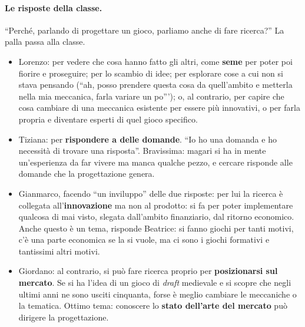 \paragraph{Le risposte della classe.} ``Perché, parlando di progettare un gioco,
parliamo anche di fare ricerca?'' La palla passa alla classe.
\begin{itemize}
  \item Lorenzo: per vedere che cosa hanno fatto gli altri, come \textbf{seme} per
        poter poi fiorire e proseguire; per lo scambio di idee; per esplorare cose a
        cui non si stava pensando (``ah, posso prendere questa cosa da quell'ambito e
        metterla nella mia meccanica, farla variare un po'''); o, al contrario, per
        capire che cosa cambiare di una meccanica esistente per essere più innovativi,
        o per farla propria e diventare esperti di quel gioco specifico.
  \item Tiziana: per \textbf{rispondere a delle domande}. ``Io ho una domanda e ho
        necessità di trovare una risposta''. Bravissima: magari si ha in mente
        un'esperienza da far vivere ma manca qualche pezzo, e cercare risponde alle
        domande che la progettazione genera.
  \item Gianmarco, facendo ``un inviluppo'' delle due risposte: per lui la ricerca è
        collegata all'\textbf{innovazione} ma non al prodotto: si fa per poter
        implementare qualcosa di mai visto, slegata dall'ambito finanziario, dal
        ritorno economico. Anche questo è un tema, risponde Beatrice: si fanno giochi
        per tanti motivi, c'è una parte economica se la si vuole, ma ci sono i giochi
        formativi e tantissimi altri motivi.
  \item Giordano: al contrario, si può fare ricerca proprio per
        \textbf{posizionarsi sul mercato}. Se si ha l'idea di un gioco di
        \emph{draft} medievale e si scopre che negli ultimi anni ne sono usciti
        cinquanta, forse è meglio cambiare le meccaniche o la tematica. Ottimo tema:
        conoscere lo \textbf{stato dell'arte del mercato} può dirigere la
        progettazione.
\end{itemize}

